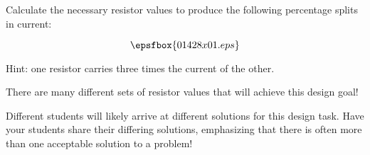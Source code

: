 

Calculate the necessary resistor values to produce the following percentage splits in current:

$$\epsfbox{01428x01.eps}$$

Hint: one resistor carries three times the current of the other.







There are many different sets of resistor values that will achieve this design goal!







Different students will likely arrive at different solutions for this design task.  Have your students share their differing solutions, emphasizing that there is often more than one acceptable solution to a problem!




